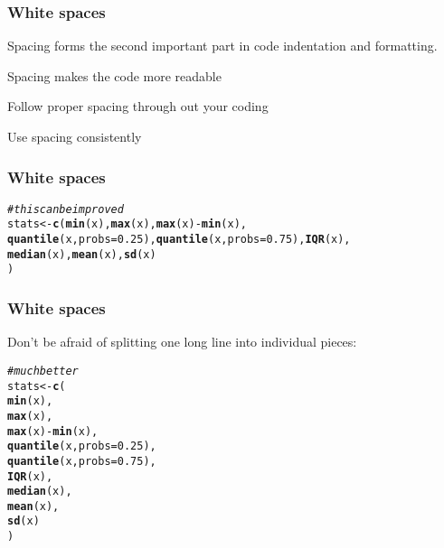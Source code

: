 \documentclass[12pt]{beamer}\usepackage[]{graphicx}\usepackage[]{color}
\makeatletter
\newcommand{\hlnum}[1]{\textcolor[rgb]{0.686,0.059,0.569}{#1}}%
\newcommand{\hlcom}[1]{\textcolor[rgb]{0.678,0.584,0.686}{\textit{#1}}}%
\newcommand{\hlopt}[1]{\textcolor[rgb]{0,0,0}{#1}}%
\newcommand{\hlstd}[1]{\textcolor[rgb]{0.345,0.345,0.345}{#1}}%
\newcommand{\hlkwb}[1]{\textcolor[rgb]{0.69,0.353,0.396}{#1}}%
\newcommand{\hlkwc}[1]{\textcolor[rgb]{0.333,0.667,0.333}{#1}}%
\newcommand{\hlkwd}[1]{\textcolor[rgb]{0.737,0.353,0.396}{\textbf{#1}}}%
\newenvironment{kframe}{%
 \def\at@end@of@kframe{}%
 \ifinner\ifhmode%
  \def\at@end@of@kframe{\end{minipage}}%
  \begin{minipage}{\columnwidth}%
 \fi\fi%
 \def\FrameCommand##1{\hskip\@totalleftmargin \hskip-\fboxsep
 \colorbox{shadecolor}{##1}\hskip-\fboxsep
     \hskip-\linewidth \hskip-\@totalleftmargin \hskip\columnwidth}%
 \MakeFramed {\advance\hsize-\width
   \@totalleftmargin\z@ \linewidth\hsize
   \@setminipage}}%
 {\par\unskip\endMakeFramed%
 \at@end@of@kframe}
\newenvironment{knitrout}{}{} %
\makeatother
\begin{document}

\begin{frame}[fragile]
\frametitle{White spaces}

\bbi
  \item Spacing forms the second important part in code indentation and formatting. 
  \item Spacing makes the code more readable
  \item Follow proper spacing through out your coding 
  \item Use spacing consistently
\ei

\end{frame}


\begin{frame}[fragile]
\frametitle{White spaces}

\begin{knitrout}\footnotesize
{}\color{fgcolor}\begin{kframe}
\begin{alltt}
\hlcom{# this can be improved}
\hlstd{stats} \hlkwb{<-} \hlkwd{c}\hlstd{(}\hlkwd{min}\hlstd{(x),} \hlkwd{max}\hlstd{(x),} \hlkwd{max}\hlstd{(x)}\hlopt{-}\hlkwd{min}\hlstd{(x),}
  \hlkwd{quantile}\hlstd{(x,} \hlkwc{probs}\hlstd{=}\hlnum{0.25}\hlstd{),} \hlkwd{quantile}\hlstd{(x,} \hlkwc{probs}\hlstd{=}\hlnum{0.75}\hlstd{),} \hlkwd{IQR}\hlstd{(x),}
  \hlkwd{median}\hlstd{(x),} \hlkwd{mean}\hlstd{(x),} \hlkwd{sd}\hlstd{(x)}
\hlstd{)}
\end{alltt}
\end{kframe}
\end{knitrout}

\end{frame}


\begin{frame}[fragile]
\frametitle{White spaces}

Don't be afraid of splitting one long line into individual pieces:
\begin{knitrout}\footnotesize
{}\color{fgcolor}\begin{kframe}
\begin{alltt}
\hlcom{# much better}
\hlstd{stats} \hlkwb{<-} \hlkwd{c}\hlstd{(}
  \hlkwd{min}\hlstd{(x),}
  \hlkwd{max}\hlstd{(x),}
  \hlkwd{max}\hlstd{(x)} \hlopt{-} \hlkwd{min}\hlstd{(x),}
  \hlkwd{quantile}\hlstd{(x,} \hlkwc{probs} \hlstd{=} \hlnum{0.25}\hlstd{),}
  \hlkwd{quantile}\hlstd{(x,} \hlkwc{probs} \hlstd{=} \hlnum{0.75}\hlstd{),}
  \hlkwd{IQR}\hlstd{(x),}
  \hlkwd{median}\hlstd{(x),}
  \hlkwd{mean}\hlstd{(x),}
  \hlkwd{sd}\hlstd{(x)}
\hlstd{)}
\end{alltt}
\end{kframe}
\end{knitrout}

\end{frame}
\end{document}
